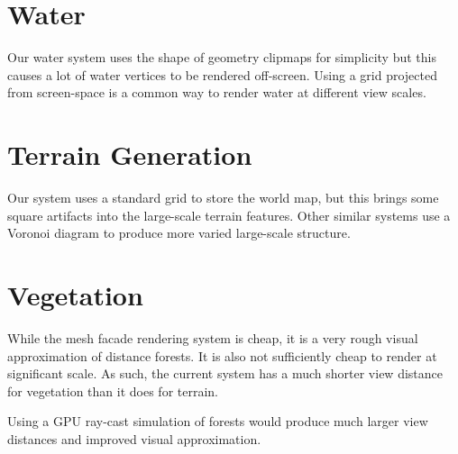 \section{Water}

Our water system uses the shape of geometry clipmaps for simplicity but this causes a lot of water vertices to be rendered off-screen.
Using a grid projected from screen-space is a common way to render water at different view scales.


\section{Terrain Generation}

Our system uses a standard grid to store the world map, but this brings some square artifacts into the large-scale terrain features.
Other similar systems use a Voronoi diagram to produce more varied large-scale structure.


\section{Vegetation}

While the mesh facade rendering system is cheap, it is a very rough visual approximation of distance forests.
It is also not sufficiently cheap to render at significant scale.
As such, the current system has a much shorter view distance for vegetation than it does for terrain.

Using a GPU ray-cast simulation of forests would produce much larger view distances and improved visual approximation. 
